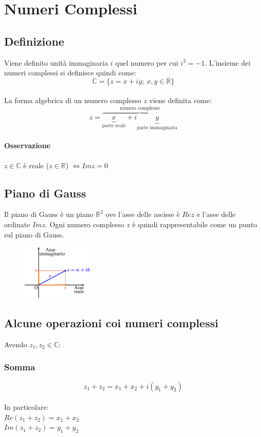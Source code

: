 \chapter{Numeri Complessi}
\section{Definizione}
Viene definito unità immaginaria $i$ quel numero per cui $i^2 = -1$.
L'insieme dei numeri complessi si definisce quindi come:\\
\begin{equation}
\mathbb{C} = \{z = x + iy;\ x,y \in \mathbb{R}\}
\end{equation}\\
La forma algebrica di un numero complesso $z$ viene definita come:
\[
z = \overbrace{
	\underbrace{x}_\text{parte reale} + i
	\underbrace{y}_\text{parte immaginaria}
}^\text{numero complesso}
\]
\subsubsection{Osservazione}
$z \in \mathbb{C}$ è reale ($z \in \mathbb{R}$) $\iff Imz = 0$

\section{Piano di Gauss}
Il piano di Gauss è un piano $\mathbb{R}^2$ ove l'asse delle ascisse è $Rez$ e l'asse delle ordinate $Imz$. Ogni numero complesso $z$ è quindi rappresentabile come un punto sul piano di Gauss.\\
\begin{figure}[htbp]
	\centering
	\includegraphics[width=0.3\textwidth]{Pictures/piano_gauss.png}
\end{figure}

\section{Alcune operazioni coi numeri complessi}
Avendo $z_1,z_2 \in \mathbb{C}$:

\subsection{Somma}
\begin{equation}
z_1+z_2 = x_1+x_2+i(y_1+y_2)
\end{equation}\\
In particolare:\\
$Re(z_1+z_2) = x_1+x_2$\\
$Im(z_1+z_2) = y_1+y_2$
